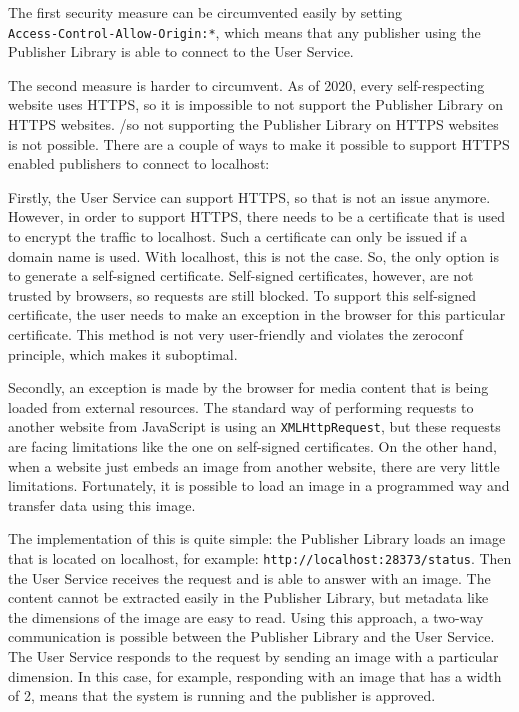 The first security measure can be circumvented easily by setting \\\texttt{Access-Control-Allow-Origin:*}, which means that any publisher using the Publisher Library is able to connect to the User Service. 

The second measure is harder to circumvent. As of 2020, every self-respecting website uses HTTPS, so it is impossible to not support the Publisher Library on HTTPS websites. /so not supporting the Publisher Library on HTTPS websites is not possible. There are a couple of ways to make it possible to support HTTPS enabled publishers to connect to localhost:

 
Firstly, the User Service can support HTTPS, so that is not an issue anymore. However, in order to support HTTPS, there needs to be a certificate that is used to encrypt the traffic to localhost. Such a certificate can only be issued if a domain name is used. With localhost, this is not the case. So, the only option is to generate a self-signed certificate. Self-signed certificates, however, are not trusted by browsers, so requests are still blocked. To support this self-signed certificate, the user needs to make an exception in the browser for this particular certificate. This method is not very user-friendly and violates the zeroconf principle, which makes it suboptimal.

Secondly, an exception is made by the browser for media content that is being loaded from external resources. The standard way of performing requests to another website from JavaScript is using an \texttt{XMLHttpRequest}, but these requests are facing limitations like the one on self-signed certificates. On the other hand, when a website just embeds an image from another website, there are very little limitations. Fortunately, it is possible to load an image in a programmed way and transfer data using this image.

The implementation of this is quite simple: the Publisher Library loads an image that is located on localhost, for example: \texttt{http://localhost:28373/status}. Then the User Service receives the request and is able to answer with an image. The content cannot be extracted easily in the Publisher Library, but metadata like the dimensions of the image are easy to read. Using this approach, a two-way communication is possible between the Publisher Library and the User Service. The User Service responds to the request by sending an image with a particular dimension. In this case, for example, responding with an image that has a width of 2, means that the system is running and the publisher is approved.


